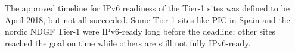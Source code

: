 
 
The approved timeline for IPv6 readiness of the Tier-1 sites was defined to be April 2018, but not all succeeded.
Some Tier-1 sites like PIC in Spain and the nordic NDGF Tier-1 were IPv6-ready long before the deadline; other sites reached the goal on time while others are still not fully IPv6-ready. 


 

